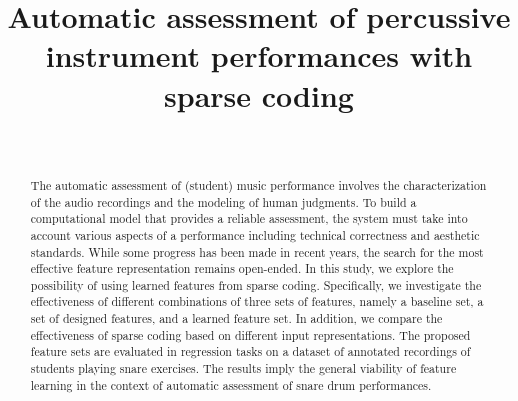 \documentclass[conference]{IEEEtran}
\begin{document}
%
\title{Automatic assessment of percussive instrument performances with sparse coding}

\author{
\and
{}
\\}





\maketitle


\begin{abstract}
The automatic assessment of (student) music performance involves the characterization of the audio recordings and the modeling of human judgments. To build a computational model that provides a reliable assessment, the system must take into account various aspects of a performance including technical correctness and aesthetic standards. While some progress has been made in recent years, the search for the most effective feature representation remains open-ended. In this study, we explore the possibility of using learned features from sparse coding. Specifically, we investigate the effectiveness of different combinations of three sets of features, namely a baseline set, a set of designed features, and a learned feature set. In addition, we compare the effectiveness of sparse coding based on different input representations. The proposed feature sets are evaluated in regression tasks on a dataset of annotated recordings of students playing snare exercises. The results imply the general viability of feature learning in the context of automatic assessment of snare drum performances.   
\end{abstract}
\end{document}
